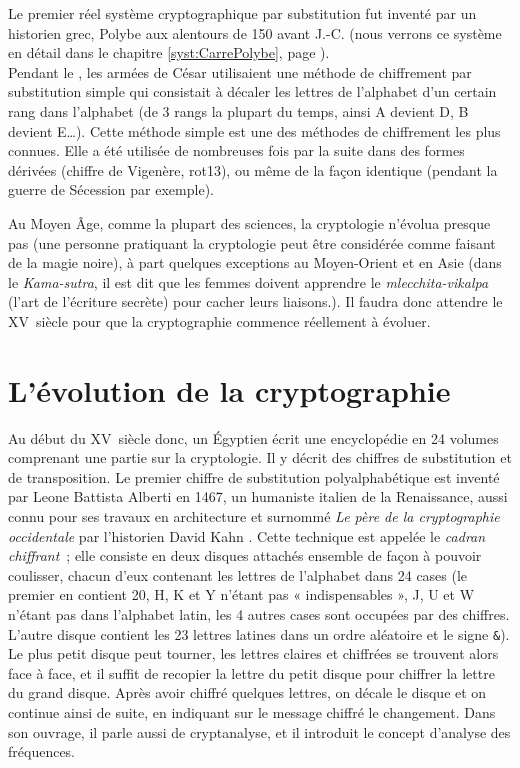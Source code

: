 Le premier réel système cryptographique par substitution fut inventé
par un historien grec, Polybe aux alentours de 150 avant J.-C. (nous
verrons ce système en détail dans le chapitre
\ref{syst:CarrePolybe}, page
\pageref{syst:CarrePolybe}). \\

\label{syst:ChiffreCesar}
Pendant le , les armées de César utilisaient une méthode de
chiffrement par substitution simple qui consistait à décaler les
lettres de l'alphabet d'un certain rang dans l'alphabet (de 3 rangs la
plupart du temps, ainsi A devient D, B devient E\dots). Cette 
méthode simple est une des méthodes de chiffrement les plus
connues. Elle a été
utilisée de nombreuses fois par la suite dans des formes dérivées (chiffre de
Vigenère, rot13), ou même
de la façon identique (pendant la guerre de Sécession par exemple).

Au Moyen Âge, comme la plupart des sciences, la cryptologie n'évolua
presque pas (une personne pratiquant la cryptologie peut être
considérée comme faisant de la magie noire), à part quelques exceptions
au Moyen-Orient et en Asie (dans le \emph{Kama-sutra}, il est dit que les
femmes doivent apprendre le \emph{mlecchita-vikalpa} (l'art de
l'écriture secrète) pour cacher leurs liaisons.). Il faudra donc
attendre le XV\ieme~siècle pour que la cryptographie commence
réellement à évoluer. \\

\section{L'évolution de la cryptographie}
Au début du XV\ieme~siècle donc, un Égyptien écrit une encyclopédie
en 24 volumes comprenant une partie sur la cryptologie. Il y décrit des
chiffres de substitution et de transposition. Le premier chiffre de
substitution polyalphabétique
est inventé par Leone Battista Alberti en 1467, un humaniste italien
de la Renaissance, aussi connu pour ses travaux en architecture et
surnommé \emph{Le père de la cryptographie occidentale} par
l'historien David Kahn \cite{Codebreakers}. Cette technique est appelée
le \emph{cadran chiffrant}\label{syst:CadranChiffrant}~; elle consiste
en deux disques attachés ensemble de façon à pouvoir coulisser,
chacun d'eux contenant les lettres de l'alphabet dans 24 cases (le premier
en contient 20, H, K et Y n'étant pas « indispensables », J, U et W
n'étant pas dans l'alphabet latin, les 4 autres cases sont occupées
par des chiffres. L'autre disque contient les 23 lettres latines dans
un ordre aléatoire et le signe \texttt{\&}). Le plus petit disque peut tourner,
les lettres claires et chiffrées se trouvent alors face à face, et il
suffit de recopier la lettre du petit disque pour chiffrer la lettre
du grand disque. Après avoir chiffré quelques lettres, on décale le
disque et on continue ainsi de suite, en indiquant sur le message
chiffré le changement. Dans son ouvrage, il parle aussi de
cryptanalyse, et il introduit le concept d'analyse des
fréquences. \\

